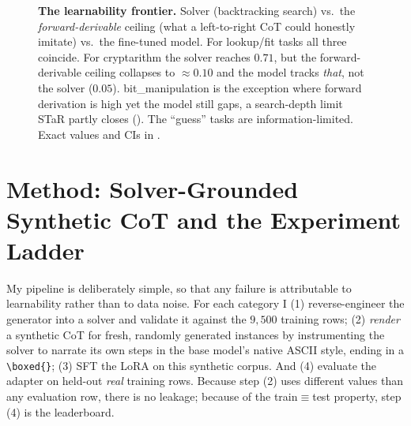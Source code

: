 \documentclass[11pt]{article}
\newcommand{\boxedans}{\texttt{\textbackslash boxed\{\}}}
\begin{document}
\begin{figure}[tbp]
\centering
{}
\caption{\textbf{The learnability frontier.} Solver (backtracking search) vs.\ the
\emph{forward-derivable} ceiling (what a left-to-right CoT could honestly imitate) vs.\ the
fine-tuned model. For lookup/fit tasks all three coincide. For cryptarithm the solver reaches
$0.71$, but the forward-derivable ceiling collapses to $\approx\!0.10$ and the model tracks
\emph{that}, not the solver ($0.05$). bit\_manipulation is the exception where forward
derivation is high yet the model still gaps, a search-depth limit STaR partly closes
(). The ``guess'' tasks are information-limited. Exact values and CIs in
.}
\label{fig:thesis}
\end{figure}

\section{Method: Solver-Grounded Synthetic CoT and the Experiment Ladder}
\label{sec:method}

My pipeline is deliberately simple, so that any failure is attributable to learnability
rather than to data noise. For each category I (1) reverse-engineer the generator into a
solver and validate it against the $9{,}500$ training rows; (2) \emph{render} a synthetic
CoT for fresh, randomly generated instances by instrumenting the solver to narrate its own
steps in the base model's native ASCII style, ending in a \boxedans{}; (3) SFT the LoRA on
this synthetic corpus. And (4) evaluate the adapter on held-out \emph{real} training rows.
Because step (2) uses different values than any evaluation row, there is no leakage; because
of the train$\equiv$test property, step (4) is the leaderboard.
\end{document}
